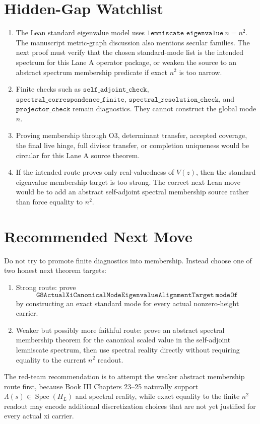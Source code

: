 \documentclass[11pt]{article}
\begin{document}
\section*{Hidden-Gap Watchlist}

\begin{enumerate}
\item The Lean standard eigenvalue model uses
  \(\texttt{lemniscate\_eigenvalue}\ n=n^2\).  The manuscript metric-graph
  discussion also mentions secular families.  The next proof must verify that
  the chosen standard-mode list is the intended spectrum for this Lane A
  operator package, or weaken the source to an abstract spectrum membership
  predicate if exact \(n^2\) is too narrow.
\item Finite checks such as
  \(\texttt{self\_adjoint\_check}\),
  \(\texttt{spectral\_correspondence\_finite}\),
  \(\texttt{spectral\_resolution\_check}\), and
  \(\texttt{projector\_check}\)
  remain diagnostics.  They cannot construct the global mode \(n\).
\item Proving membership through O3, determinant transfer, accepted coverage,
  the final live hinge, full divisor transfer, or completion uniqueness would
  be circular for this Lane A source theorem.
\item If the intended route proves only real-valuedness of \(V(z)\), then the
  standard eigenvalue membership target is too strong.  The correct next Lean
  move would be to add an abstract self-adjoint spectral membership source
  rather than force equality to \(n^2\).
\end{enumerate}

\section*{Recommended Next Move}

Do not try to promote finite diagnostics into membership.  Instead choose one
of two honest next theorem targets:

\begin{enumerate}
\item Strong route:
  prove
  \[
    \texttt{G8ActualXiCanonicalModeEigenvalueAlignmentTarget}\ \texttt{modeOf}
  \]
  by constructing an exact standard mode for every actual nonzero-height
  carrier.
\item Weaker but possibly more faithful route:
  prove an abstract spectral membership theorem for the canonical scaled value
  in the self-adjoint lemniscate spectrum, then use spectral reality directly
  without requiring equality to the current \(n^2\) readout.
\end{enumerate}

The red-team recommendation is to attempt the weaker abstract membership route
first, because Book III Chapters 23--25 naturally support
\(\Lambda(s)\in\operatorname{Spec}(H_L)\) and spectral reality, while exact
equality to the finite \(n^2\) readout may encode additional discretization
choices that are not yet justified for every actual xi carrier.
\end{document}
